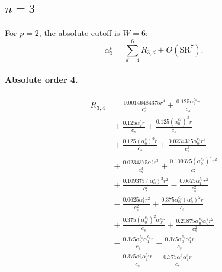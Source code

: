 \documentclass[10pt]{article}
\begin{document}
\subsection{$n=3$}
For $p=2$, the absolute cutoff is $W=6$:
\[\alpha_{3}^t=\sum_{d=4}^{6}R_{3,d}+O(\mathrm{SR}^{7}).\]
\paragraph{Absolute order 4.}
\begin{align*}
R_{3,4} &= \frac{0.00146484375 r^{4}}{c_{s}^{4}} + \frac{0.125 \alpha_{2}^{c_s} r}{c_{s}} \\
&{}  + \frac{0.125 \alpha_{2}^s r}{c_{s}} + \frac{0.125 \left(\alpha_{0}^{c_s}\right)^{3} r}{c_{s}} \\
&{}  + \frac{0.125 \left(\alpha_{0}^s\right)^{3} r}{c_{s}} + \frac{0.0234375 \alpha_{0}^{c_s} r^{3}}{c_{s}^{3}} \\
&{}  + \frac{0.0234375 \alpha_{0}^s r^{3}}{c_{s}^{3}} + \frac{0.109375 \left(\alpha_{0}^{c_s}\right)^{2} r^{2}}{c_{s}^{2}} \\
&{}  + \frac{0.109375 \left(\alpha_{0}^s\right)^{2} r^{2}}{c_{s}^{2}} - \frac{0.0625 \alpha_{1}^{c_s} r^{2}}{c_{s}^{2}} \\
&{}  - \frac{0.0625 \alpha_{1}^s r^{2}}{c_{s}^{2}} + \frac{0.375 \alpha_{0}^{c_s} \left(\alpha_{0}^s\right)^{2} r}{c_{s}} \\
&{}  + \frac{0.375 \left(\alpha_{0}^{c_s}\right)^{2} \alpha_{0}^s r}{c_{s}} + \frac{0.21875 \alpha_{0}^{c_s} \alpha_{0}^s r^{2}}{c_{s}^{2}} \\
&{}  - \frac{0.375 \alpha_{0}^{c_s} \alpha_{1}^{c_s} r}{c_{s}} - \frac{0.375 \alpha_{0}^{c_s} \alpha_{1}^s r}{c_{s}} \\
&{}  - \frac{0.375 \alpha_{0}^s \alpha_{1}^{c_s} r}{c_{s}} - \frac{0.375 \alpha_{0}^s \alpha_{1}^s r}{c_{s}}
\end{align*}
\end{document}
